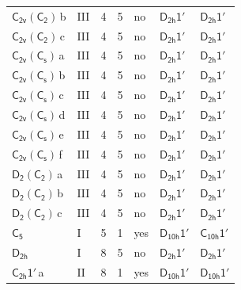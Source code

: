 \documentclass[10pt,a4paper]{article}
\numberwithin{equation}{section}
\newcommand{\grp}[1]{\mathsf{#1}}
\newcommand{\clsletter}[1]{\,{\scriptsize\color{black!55}#1}}
\begin{document}
{\begin{longtable}{@{}llrrlll@{}}
\href{C2v-C2.pdf}{$\grp{C_{2v}}(\grp{C_{2}})$}\clsletter{b} & III & 4 & 5 & no & \href{D2h-1p.pdf}{$\grp{D_{2h}1'}$} & \href{D2h-1p.pdf}{$\grp{D_{2h}1'}$}\\
\href{C2v-C2.pdf}{$\grp{C_{2v}}(\grp{C_{2}})$}\clsletter{c} & III & 4 & 5 & no & \href{D2h-1p.pdf}{$\grp{D_{2h}1'}$} & \href{D2h-1p.pdf}{$\grp{D_{2h}1'}$}\\
\href{C2v-C1v.pdf}{$\grp{C_{2v}}(\grp{C_{s}})$}\clsletter{a} & III & 4 & 5 & no & \href{D2h-1p.pdf}{$\grp{D_{2h}1'}$} & \href{D2h-1p.pdf}{$\grp{D_{2h}1'}$}\\
\href{C2v-C1v.pdf}{$\grp{C_{2v}}(\grp{C_{s}})$}\clsletter{b} & III & 4 & 5 & no & \href{D2h-1p.pdf}{$\grp{D_{2h}1'}$} & \href{D2h-1p.pdf}{$\grp{D_{2h}1'}$}\\
\href{C2v-C1v.pdf}{$\grp{C_{2v}}(\grp{C_{s}})$}\clsletter{c} & III & 4 & 5 & no & \href{D2h-1p.pdf}{$\grp{D_{2h}1'}$} & \href{D2h-1p.pdf}{$\grp{D_{2h}1'}$}\\
\href{C2v-C1v.pdf}{$\grp{C_{2v}}(\grp{C_{s}})$}\clsletter{d} & III & 4 & 5 & no & \href{D2h-1p.pdf}{$\grp{D_{2h}1'}$} & \href{D2h-1p.pdf}{$\grp{D_{2h}1'}$}\\
\href{C2v-C1v.pdf}{$\grp{C_{2v}}(\grp{C_{s}})$}\clsletter{e} & III & 4 & 5 & no & \href{D2h-1p.pdf}{$\grp{D_{2h}1'}$} & \href{D2h-1p.pdf}{$\grp{D_{2h}1'}$}\\
\href{C2v-C1v.pdf}{$\grp{C_{2v}}(\grp{C_{s}})$}\clsletter{f} & III & 4 & 5 & no & \href{D2h-1p.pdf}{$\grp{D_{2h}1'}$} & \href{D2h-1p.pdf}{$\grp{D_{2h}1'}$}\\
\href{D2-C2.pdf}{$\grp{D_{2}}(\grp{C_{2}})$}\clsletter{a} & III & 4 & 5 & no & \href{D2h-1p.pdf}{$\grp{D_{2h}1'}$} & \href{D2h-1p.pdf}{$\grp{D_{2h}1'}$}\\
\href{D2-C2.pdf}{$\grp{D_{2}}(\grp{C_{2}})$}\clsletter{b} & III & 4 & 5 & no & \href{D2h-1p.pdf}{$\grp{D_{2h}1'}$} & \href{D2h-1p.pdf}{$\grp{D_{2h}1'}$}\\
\href{D2-C2.pdf}{$\grp{D_{2}}(\grp{C_{2}})$}\clsletter{c} & III & 4 & 5 & no & \href{D2h-1p.pdf}{$\grp{D_{2h}1'}$} & \href{D2h-1p.pdf}{$\grp{D_{2h}1'}$}\\
\href{../../../rotation/data/pdf/C5.pdf}{$\grp{C_{5}}$} & I & 5 & 1 & yes & \href{D10h-1p.pdf}{$\grp{D_{10h}1'}$} & \href{C10h-1p.pdf}{$\grp{C_{10h}1'}$}\\
\href{../../../rotation/data/pdf/D2h.pdf}{$\grp{D_{2h}}$} & I & 8 & 5 & no & \href{D2h-1p.pdf}{$\grp{D_{2h}1'}$} & \href{D2h-1p.pdf}{$\grp{D_{2h}1'}$}\\
\href{C2h-1p.pdf}{$\grp{C_{2h}1'}$}\clsletter{a} & II & 8 & 1 & yes & \href{D10h-1p.pdf}{$\grp{D_{10h}1'}$} & \href{D10h-1p.pdf}{$\grp{D_{10h}1'}$}\\

\end{longtable}}
\end{document}
